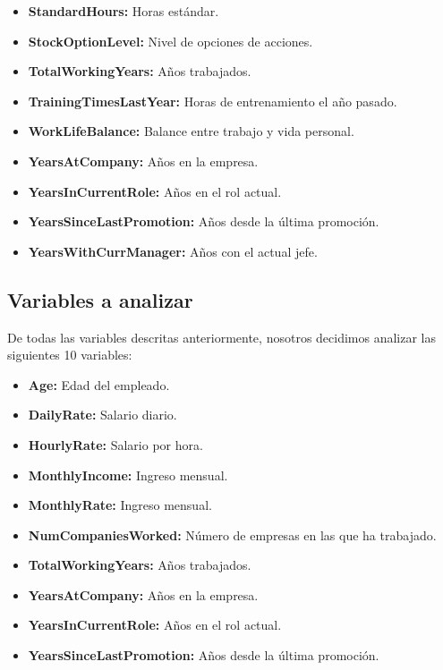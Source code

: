\begin{itemize}
    \item \textbf{StandardHours:} Horas estándar.
    \item \textbf{StockOptionLevel:} Nivel de opciones de acciones.
    \item \textbf{TotalWorkingYears:} Años trabajados.
    \item \textbf{TrainingTimesLastYear:} Horas de entrenamiento el año pasado.
    \item \textbf{WorkLifeBalance:} Balance entre trabajo y vida personal.
    \item \textbf{YearsAtCompany:} Años en la empresa.
    \item \textbf{YearsInCurrentRole:} Años en el rol actual.
    \item \textbf{YearsSinceLastPromotion:} Años desde la última promoción.
    \item \textbf{YearsWithCurrManager:} Años con el actual jefe.
\end{itemize}


\subsection{Variables a analizar}
De todas las variables descritas anteriormente, nosotros decidimos analizar las
siguientes 10 variables:
\begin{itemize}
    \item \textbf{Age:} Edad del empleado.
    \item \textbf{DailyRate:} Salario diario.
    \item \textbf{HourlyRate:} Salario por hora.
    \item \textbf{MonthlyIncome:} Ingreso mensual.
    \item \textbf{MonthlyRate:} Ingreso mensual.
    \item \textbf{NumCompaniesWorked:} Número de empresas en las que ha trabajado.
    \item \textbf{TotalWorkingYears:} Años trabajados.
    \item \textbf{YearsAtCompany:} Años en la empresa.
    \item \textbf{YearsInCurrentRole:} Años en el rol actual.
    \item \textbf{YearsSinceLastPromotion:} Años desde la última promoción.
\end{itemize}